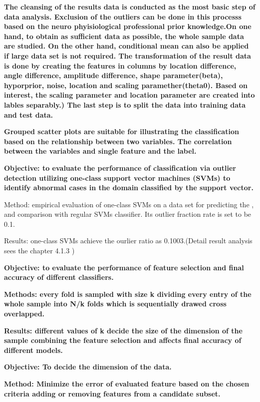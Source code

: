 \documentclass[5p]{elsarticle}
\begin{document}
\begin{frontmatter}
\bf The cleansing of the results data is conducted as the most basic step of data analysis. Exclusion of the outliers can be done in this processs based on the neuro phyisiological professional prior knowledge.On one hand,  to obtain as sufficient data as possible, the whole sample data are studied. On the other hand, conditional mean can also be applied if large data set is not required. 
\bf The transformation of the result data is done by creating the features in columns by location difference, angle difference, amplitude difference, shape parameter(beta), hyporprior, noise, location and scaling paramether(theta0). Based on interest, the scaling parameter and location parameter are created into lables separably.) The last step is to split the data into training data and test data. 

\bf Grouped scatter plots are suitable for illustrating the classification based on the relationship between two variables. The correlation between the variables and single feature and the label.

\bf Objective: to evaluate the performance of classification via outlier detection utilizing one-class support vector machines (SVMs) to identify abnormal cases in the domain classified by the support vector.

Method: empirical evaluation of one-class SVMs on a data set for predicting the , and comparison with regular SVMs classifier. Its outlier fraction rate is set to be 0.1.

Results: one-class SVMs achieve the ourlier ratio as 0.1003.(Detail result analysis sees the chapter 4.1.3 )


\bf Objective: to evaluate the performance of feature selection and final accuracy of different classifiers.

\bf Methods: every fold is sampled with size k dividing every entry of the whole sample into N/k folds which is sequentially drawed cross overlapped.

\bf Results: different values of k decide the size of the dimension of the sample combining the feature selection and affects final accuracy of different models.


\bf Objective: To decide the dimension of the data.

\bf Method: Minimize the error of evaluated feature based on the chosen criteria adding or removing features from a candidate subset.


\end{frontmatter}
\end{document}
